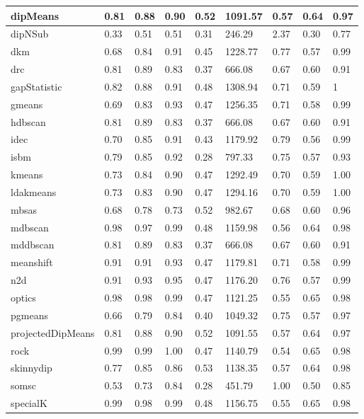 \begin{table}[H]
\begin{tabular}{|l|l|l|l|l|l|l|l|l|}
\hline
dipMeans & 0.81 & 0.88 & 0.90 & 0.52 & 1091.57 & 0.57 & 0.64 & 0.97 \\
\hline
dipNSub & 0.33 & 0.51 & 0.51 & 0.31 & 246.29 & 2.37 & 0.30 & 0.77 \\
\hline
dkm & 0.68 & 0.84 & 0.91 & 0.45 & 1228.77 & 0.77 & 0.57 & 0.99 \\
\hline
drc & 0.81 & 0.89 & 0.83 & 0.37 & 666.08 & 0.67 & 0.60 & 0.91 \\
\hline
gapStatistic & 0.82 & 0.88 & 0.91 & 0.48 & 1308.94 & 0.71 & 0.59 & 1 \\
\hline
gmeans & 0.69 & 0.83 & 0.93 & 0.47 & 1256.35 & 0.71 & 0.58 & 0.99 \\
\hline
hdbscan & 0.81 & 0.89 & 0.83 & 0.37 & 666.08 & 0.67 & 0.60 & 0.91 \\
\hline
idec & 0.70 & 0.85 & 0.91 & 0.43 & 1179.92 & 0.79 & 0.56 & 0.99 \\
\hline
isbm & 0.79 & 0.85 & 0.92 & 0.28 & 797.33 & 0.75 & 0.57 & 0.93 \\
\hline
kmeans & 0.73 & 0.84 & 0.90 & 0.47 & 1292.49 & 0.70 & 0.59 & 1.00 \\
\hline
ldakmeans & 0.73 & 0.83 & 0.90 & 0.47 & 1294.16 & 0.70 & 0.59 & 1.00 \\
\hline
mbsas & 0.68 & 0.78 & 0.73 & 0.52 & 982.67 & 0.68 & 0.60 & 0.96 \\
\hline
mdbscan & 0.98 & 0.97 & 0.99 & 0.48 & 1159.98 & 0.56 & 0.64 & 0.98 \\
\hline
mddbscan & 0.81 & 0.89 & 0.83 & 0.37 & 666.08 & 0.67 & 0.60 & 0.91 \\
\hline
meanshift & 0.91 & 0.91 & 0.93 & 0.47 & 1179.81 & 0.71 & 0.58 & 0.99 \\
\hline
n2d & 0.91 & 0.93 & 0.95 & 0.47 & 1176.20 & 0.76 & 0.57 & 0.99 \\
\hline
optics & 0.98 & 0.98 & 0.99 & 0.47 & 1121.25 & 0.55 & 0.65 & 0.98 \\
\hline
pgmeans & 0.66 & 0.79 & 0.84 & 0.40 & 1049.32 & 0.75 & 0.57 & 0.97 \\
\hline
projectedDipMeans & 0.81 & 0.88 & 0.90 & 0.52 & 1091.55 & 0.57 & 0.64 & 0.97 \\
\hline
rock & 0.99 & 0.99 & 1.00 & 0.47 & 1140.79 & 0.54 & 0.65 & 0.98 \\
\hline
skinnydip & 0.77 & 0.85 & 0.86 & 0.53 & 1138.35 & 0.57 & 0.64 & 0.98 \\
\hline
somsc & 0.53 & 0.73 & 0.84 & 0.28 & 451.79 & 1.00 & 0.50 & 0.85 \\
\hline
specialK & 0.99 & 0.98 & 0.99 & 0.48 & 1156.75 & 0.55 & 0.65 & 0.98 \\

\end{tabular}
\end{table}
